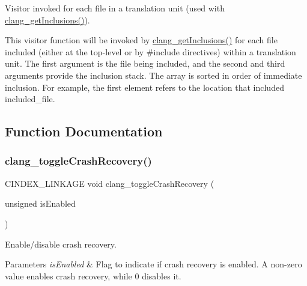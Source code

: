 Visitor invoked for each file in a translation unit (used with \mbox{\hyperlink{group__CINDEX__MISC_ga4363bd8c203ca2b5dfc23c5765695d60}{clang\+\_\+get\+Inclusions()}}). 

This visitor function will be invoked by \mbox{\hyperlink{group__CINDEX__MISC_ga4363bd8c203ca2b5dfc23c5765695d60}{clang\+\_\+get\+Inclusions()}} for each file included (either at the top-\/level or by \#include directives) within a translation unit. The first argument is the file being included, and the second and third arguments provide the inclusion stack. The array is sorted in order of immediate inclusion. For example, the first element refers to the location that included \textquotesingle{}included\+\_\+file\textquotesingle{}. 

\subsection{Function Documentation}
\mbox{\label{group__CINDEX__MISC_ga45afc52d275aa0587c69d4b6d2f10bf2}} 
\subsubsection{\texorpdfstring{clang\+\_\+toggle\+Crash\+Recovery()}{clang\_toggleCrashRecovery()}}
{\footnotesize\ttfamily C\+I\+N\+D\+E\+X\+\_\+\+L\+I\+N\+K\+A\+GE void clang\+\_\+toggle\+Crash\+Recovery (\begin{DoxyParamCaption}\item[{unsigned}]{is\+Enabled }\end{DoxyParamCaption})}



Enable/disable crash recovery. 


\begin{DoxyParams}{Parameters}
{\em is\+Enabled} & Flag to indicate if crash recovery is enabled. A non-\/zero value enables crash recovery, while 0 disables it. \\
\hline
\end{DoxyParams}
